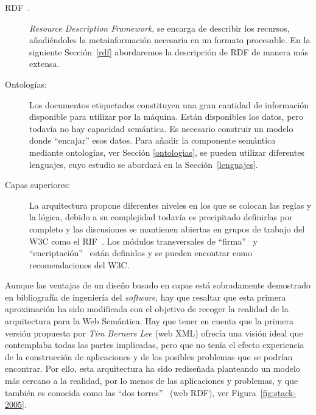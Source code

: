 \begin{description}
\item[\gls{RDF}~\cite{RDF}.] \textit{Resource Description Framework}, se encarga
de describir los recursos, añadiéndoles la metainformación necesaria en
un formato procesable. En la siguiente Sección~\ref{rdf} abordaremos la descripción de
RDF de manera más extensa.

\item[Ontologías:] Los documentos etiquetados constituyen una gran cantidad
de información disponible para utilizar por la máquina. Están disponibles los datos, pero
todavía no hay capacidad semántica. Es necesario construir un modelo donde ``encajar''
esos datos. Para añadir la componente semántica mediante ontologías, ver Sección
\ref{ontologias}, se pueden utilizar diferentes lenguajes, cuyo estudio se 
abordará en la Sección~\ref{lenguajes}.

\item[Capas superiores:] La arquitectura propone diferentes niveles en los
que se colocan las reglas y la lógica, debido a su complejidad todavía es precipitado definirlas por completo y las discusiones se mantienen
abiertas en grupos de trabajo del \gls{W3C} como el \gls{RIF}~\cite{rif-core}. 
Los módulos transversales de ``firma''~\cite{XML-dsig} y 
``encriptación''~\cite{XML-enc} están definidos y se
pueden encontrar como recomendaciones del W3C.

\end{description}

Aunque las ventajas de un diseño basado en capas está sobradamente demostrado en
bibliografía de ingeniería del \textit{software}, hay que resaltar que esta primera
aproximación ha sido modificada con el objetivo de recoger la realidad de la
arquitectura para la Web Semántica. Hay que tener en cuenta que la primera
versión propuesta por \textit{Tim Berners Lee} (web XML) ofrecía una visión ideal
que contemplaba todas las partes implicadas, pero que no tenía el efecto experiencia
de la construcción de aplicaciones y de los posibles problemas que se podrían
encontrar. Por ello, esta arquitectura ha sido rediseñada planteando un modelo
más cercano a la realidad, por lo menos de las aplicaciones y problemas, y que
también es conocida como las ``dos torres''~\cite{kifer05} (web RDF), ver Figura~\ref{fig:stack-2005}.


